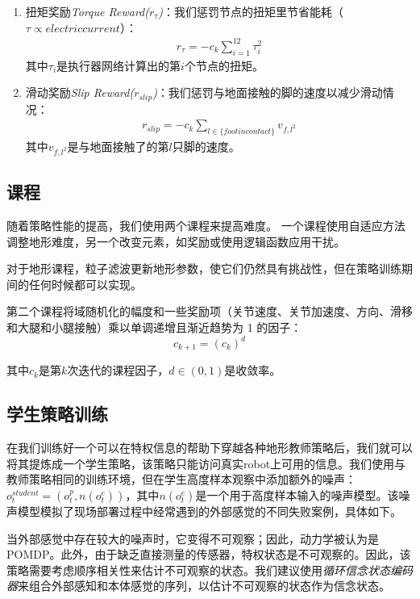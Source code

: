\begin{enumerate}
    \item 扭矩奖励\emph{Torque Reward($r_{\tau}$)}：我们惩罚节点的扭矩里节省能耗（$\tau\propto electric current$）：\begin{align}
      r_{\tau}=-c_k\sum_{i=1}^{12}\tau_i^2
    \end{align}其中$\tau_i$是执行器网络计算出的第$i$个节点的扭矩。
    \item 滑动奖励\emph{Slip Reward($r_{slip}$)}：我们惩罚与地面接触的脚的速度以减少滑动情况：\begin{align}
      r_{slip}=-c_k\sum_{l\in \{foot in contact\}}v_{f,l^2}
    \end{align}其中$v_{f,l^2}$是与地面接触了的第$l$只脚的速度。
  \end{enumerate}
  \subsection[课程]{课程}
  随着策略性能的提高，我们使用两个课程来提高难度。
  一个课程使用自适应方法\cite[p]{Lee_Hwangbo_Wellhausen_Koltun_Hutter_2020}调整地形难度，另一个改变元素，如奖励或使用逻辑函数\cite[p]{Hwangbo_Lee_Dosovitskiy_Bellicoso_Tsounis_Koltun_Hutter_2019}应用干扰。
  
  对于地形课程，粒子滤波更新地形参数，使它们仍然具有挑战性，但在策略训练期间的任何时候都可以实现\cite[p]{Lee_Hwangbo_Wellhausen_Koltun_Hutter_2020}。
  
  第二个课程将域随机化的幅度和一些奖励项（关节速度、关节加速度、方向、滑移和大腿和小腿接触）乘以单调递增且渐近趋势为 1 的因子：$$c_{k+1}=(c_k)^d$$
  
  其中$c_k$是第$k$次迭代的课程因子，$d\in(0,1)$是收敛率。
  
  \subsection[学生策略训练]{学生策略训练}
  
  在我们训练好一个可以在特权信息的帮助下穿越各种地形教师策略后，我们就可以将其提炼成一个学生策略，该策略只能访问真实robot上可用的信息。我们使用与教师策略相同的训练环境，但在学生高度样本观察中添加额外的噪声：$o_t^{student}=(o_t^p,n(o_t^e))$，其中$n(o_t^e)$是一个用于高度样本输入的噪声模型。该噪声模型模拟了现场部署过程中经常遇到的外部感觉的不同失败案例，具体如下。
  
  当外部感觉中存在较大的噪声时，它变得不可观察；因此，动力学被认为是POMDP。此外，由于缺乏直接测量的传感器，特权状态是不可观察的。因此，该策略需要考虑顺序相关性来估计不可观察的状态。我们建议使用\emph{循环信念状态编码器}来组合外部感知和本体感觉的序列，以估计不可观察的状态作为信念状态。
  
